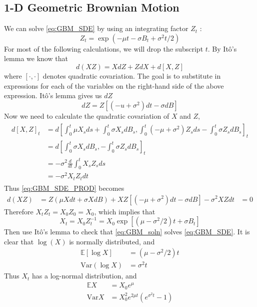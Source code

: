 \documentclass{amsart}
\theoremstyle{definition}
\theoremstyle{remark}
\begin{document}
\subsection{1-D Geometric Brownian Motion}
We can solve \eqref{eq:GBM_SDE} by using an integrating factor $Z_t$ \cite[p. 235]{timo}:
\begin{equation*}
Z_t = \exp\left(-\mu t -\sigma B_t + \sigma^2 t/2 \right)
\end{equation*}
For most of the following calculations, we will drop the subscript $t$. By It\^o's lemma we know that
\begin{equation}\label{eq:GBM_SDE_PROD}
d(XZ) = X dZ + Z dX + d[X,Z]
\end{equation}
where $[\cdot,\cdot]$ denotes quadratic covariation. The goal is to substitute in expressions for each of the variables on the right-hand side of the above expression. It\^o's lemma gives us $dZ$
\begin{equation*}
dZ = Z \left[\left(-u + \sigma^2\right) dt - \sigma dB\right]
\end{equation*}
Now we need to calculate the quadratic covariation of $X$ and $Z$,
\begin{align*}
\begin{split}
d[X,Z]_t &= d\left[\int_0^t \mu X_s ds + \int_0^t \sigma X_s dB_s,  \int_0^t (-\mu +\sigma^2) Z_s ds - \int_0^t \sigma Z_s dB_s \right]_t\\
&= d\left[\int_0^t \sigma X_s dB_s,  - \int_0^t \sigma Z_s dB_s \right]_t\\
&= -\sigma ^2 \frac{d}{dt}\int_0^t X_s Z_s ds\\
&= -\sigma^2 X_t Z_t dt
\end{split}
\end{align*}
Thus \eqref{eq:GBM_SDE_PROD} becomes
\begin{align*}
d(XZ) &= Z(\mu X dt + \sigma X dB) + XZ\left[\left(-\mu + \sigma^2 \right)dt -\sigma dB \right] - \sigma^2 X Z dt
&= 0
\end{align*}
Therefore $X_t Z_t = X_0 Z_0 = X_0$, which implies that
\begin{equation}\label{eq:GBM_soln}
X_t =  X_0 Z_t^{-1} = X_0 \exp\left[(\mu - \sigma^2/2) t + \sigma B_t\right]
\end{equation}
Then use It\^o's lemma to check that \eqref{eq:GBM_soln} solves \eqref{eq:GBM_SDE}. It is clear that $\log(X)$ is normally distributed, and
\begin{align*}
\mathbb{E}[\log X ] &= (\mu - \sigma^2/2)t\\
\text{Var}(\log X ) &= \sigma^2 t
\end{align*} 
Thus $X_t$ has a log-normal distribution, and
\begin{align*}
\mathbb{E} X&= X_0 e^\mu\\
\text{Var}X &= X_0^2 e^{2\mu t}(e^{\sigma^2 t} - 1)
\end{align*}
\end{document}
